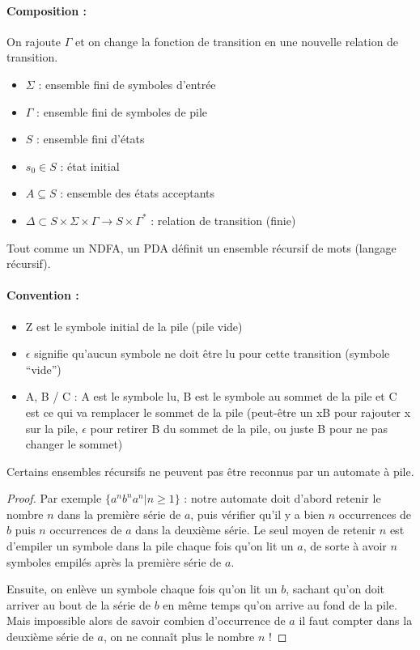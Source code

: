 \paragraph{Composition :}
On rajoute $\Gamma$ et on change la fonction de transition en une nouvelle
relation de transition.
\begin{itemize}
	\item $\Sigma$ : ensemble fini de symboles d'entrée
	\item $\Gamma$ : ensemble fini de symboles de pile
	\item $S$ : ensemble fini d'états
	\item $s_0 \in S$ : état initial
	\item $A \subseteq S$ : ensemble des états acceptants
	\item $\Delta \subset S \times \Sigma \times \Gamma \rightarrow S \times
		\Gamma^*$ : relation de transition (finie)
\end{itemize}

\begin{myprop}
	Tout comme un NDFA, un PDA définit un ensemble récursif de mots (langage
	récursif).
\end{myprop}

\paragraph{Convention :}
\begin{itemize}
	\item Z est le symbole initial de la pile (pile vide)
	\item $\epsilon$ signifie qu’aucun symbole ne doit être lu pour cette
		transition (symbole ``vide'')
	\item A, B / C : A est le symbole lu, B est le symbole au
		sommet de la pile et C est ce qui va remplacer le
		sommet de la pile (peut-être un xB pour
		rajouter x sur la pile, $\epsilon$ pour retirer B du sommet de la pile,
		ou juste B pour ne pas changer le sommet)
\end{itemize}

\begin{myprop}
	Certains ensembles récursifs ne peuvent pas être reconnus par un automate
	à pile.
\end{myprop}

\begin{proof}
	Par exemple $\{a^n b^n a^n | n\geq 1\}$ : notre automate doit d'abord retenir le nombre $n$ dans la première série de $a$, puis vérifier qu'il y a bien $n$ occurrences de $b$ puis $n$ occurrences de $a$ dans la deuxième série. Le seul moyen de retenir $n$ est d'empiler un symbole dans la pile chaque fois qu'on lit un $a$, de sorte à avoir $n$ symboles empilés après la première série de $a$.

	Ensuite, on enlève un symbole chaque fois qu'on lit un $b$, sachant qu'on doit arriver au bout de la série de $b$ en même temps qu'on arrive au fond de la pile. Mais impossible alors de savoir combien d'occurrence de $a$ il faut compter dans la deuxième série de $a$, on ne connaît plus le nombre $n$ !
\end{proof}

